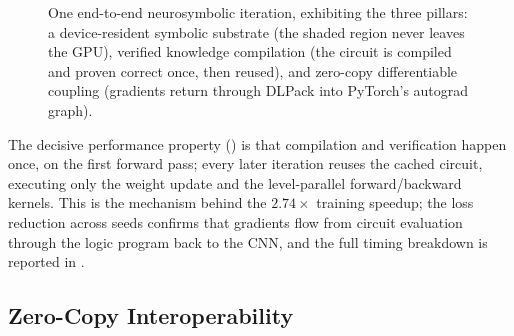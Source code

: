 \begin{figure}[tbp]
  \centering
  \caption{One end-to-end neurosymbolic iteration, exhibiting the three pillars: a device-resident symbolic substrate (the shaded region never leaves the GPU), verified knowledge compilation (the circuit is compiled and proven correct once, then reused), and zero-copy differentiable coupling (gradients return through DLPack into PyTorch's autograd graph).}
  \label{fig:training}
\end{figure}

The decisive performance property () is that compilation and verification happen once, on the first forward pass; every later iteration reuses the cached circuit, executing only the weight update and the level-parallel forward/backward kernels. This is the mechanism behind the $2.74\times$ training speedup; the loss reduction across seeds confirms that gradients flow from circuit evaluation through the logic program back to the CNN, and the full timing breakdown is reported in .

\subsection{Zero-Copy Interoperability}\label{subsec:interop}

